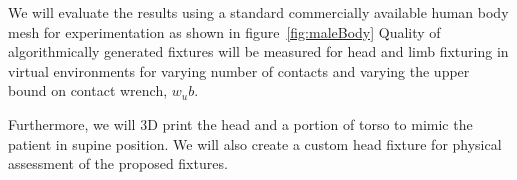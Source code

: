 We will evaluate the results using a standard commercially available human body 
mesh for experimentation as shown in figure~\ref{fig:maleBody} Quality 
of algorithmically generated fixtures will be measured for head and limb 
fixturing in virtual environments for varying number of contacts and varying the upper bound on contact wrench, $w_ub$.

Furthermore, we will 3D print the head and a portion of torso to mimic the patient in supine position. We will also create a custom head fixture for physical assessment of the proposed fixtures. 